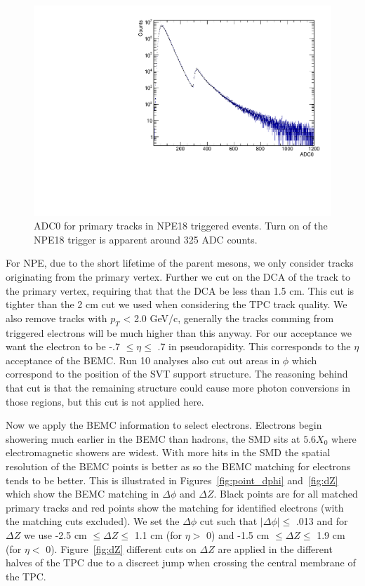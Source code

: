\begin{figure}[htbp]
\begin{center}
\includegraphics[scale=.75]{Plots/NPE/ADC0_NPE18.pdf}
\end{center}
\caption[ADC0 Distribution for NPE18]{ADC0 for primary tracks in NPE18 triggered events. Turn on of the NPE18 trigger is apparent around 325 ADC counts.}
\label{fig:ADC0}
\end{figure}

For NPE, due to the short lifetime of the parent mesons, we only consider tracks originating from the primary vertex. Further we cut on the DCA of the track to the primary vertex, requiring that that the DCA be less than 1.5 cm. This cut is tighter than the 2 cm cut we used when considering the TPC track quality. We also remove tracks with $p_T$ < 2.0 GeV/c, generally the tracks comming from triggered electrons will be much higher than this anyway. For our acceptance we want the electron to be -.7 $\leq \eta \leq$ .7 in  pseudorapidity. This corresponds to the $\eta$ acceptance of the BEMC. Run 10 analyses also cut out areas in $\phi$ which correspond to the position of the SVT support structure. The reasoning behind that cut is that the remaining structure could cause more photon conversions in those regions, but this cut is not applied here.

Now we apply the BEMC information to select electrons. Electrons begin showering much earlier in the BEMC than hadrons, the SMD sits at $5.6 X_0$ where electromagnetic showers are widest. With more hits in the SMD the spatial resolution of the BEMC points is better as so the BEMC matching for electrons tends to be better. This is illustrated in Figures~\ref{fig:point_dphi} and~\ref{fig:dZ} which show the BEMC matching in $\Delta\phi$ and $\Delta Z$. Black points are for all matched primary tracks and red points show the matching for identified electrons (with the matching cuts excluded). We set the $\Delta\phi$ cut such that $|\Delta\phi| \leq$ .013 and for $\Delta Z$ we use -2.5 cm $\leq \Delta Z \leq$ 1.1 cm (for $\eta >$ 0) and -1.5 cm $\leq \Delta Z \leq$ 1.9 cm (for $\eta <$ 0). Figure~\ref{fig:dZ} different cuts on $\Delta Z$ are applied in the different halves of the TPC due to a discreet jump when crossing the central membrane of the TPC.

